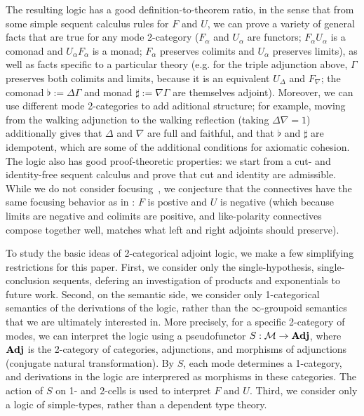 \documentclass{drl-common/llncs}
\begin{document}
The resulting logic has a good definition-to-theorem ratio, in the sense
that from some simple sequent calculus rules for $F$ and $U$, we can
prove a variety of general facts that are true for any mode 2-category
($F_\alpha$ and $U_\alpha$ are functors; $F_\alpha U_\alpha$ is a
comonad and $U_\alpha F_\alpha$ is a monad; $F_\alpha$ preserves
colimits and $U_\alpha$ preserves limits), as well as facts specific to
a particular theory (e.g. for the triple adjunction above, $\Gamma$
preserves both colimits and limits, because it is an equivalent
$U_\Delta$ and $F_\nabla$; the comonad $\flat := \Delta\Gamma$ and monad
$\sharp := \nabla\Gamma$ are themselves adjoint).  Moreover, we can use
different mode 2-categories to add aditional structure; for example,
moving from the walking adjunction to the walking reflection (taking
$\Delta \nabla = 1$) additionally gives that $\Delta$ and $\nabla$
are full and faithful, and that $\flat$ and $\sharp$ are idempotent,
which are some of the additional conditions for axiomatic cohesion.
The logic also has good proof-theoretic properties: we start from a cut-
and identity-free sequent calculus and prove that cut and identity are
admissible.  While we do not consider focusing~\citep{andreoli92focus},
we conjecture that the connectives have the same focusing behavior as in
\citep{reed09adjoint}: $F$ is postive and $U$ is negative (which
because limits are negative and colimits are positive, and like-polarity
connectives compose together well, matches what left and right adjoints
should preserve).  

To study the basic ideas of 2-categorical adjoint logic, we make a few
simplifying restrictions for this paper. First, we consider only the
single-hypothesis, single-conclusion sequents, defering an investigation
of products and exponentials to future work.  Second, on the semantic
side, we consider only 1-categorical semantics of the derivations of the
logic, rather than the $\infty$-groupoid semantics that we are
ultimately interested in.  More precisely, for a specific 2-category
\M\/ of modes, we can interpret the logic using a pseudofunctor $S : \mathcal{M}
\to \textbf{Adj}$, where $\textbf{Adj}$ is the 2-category of categories, adjunctions,
and morphisms of adjunctions (conjugate natural transformation).  By
$S$, each mode determines a 1-category, and derivations in the logic are
interprered as morphisms in these categories.  The action of $S$ on 1-
and 2-cells is used to interpret $F$ and $U$.  Third, we consider only a
logic of simple-types, rather than a dependent type theory.
\end{document}
